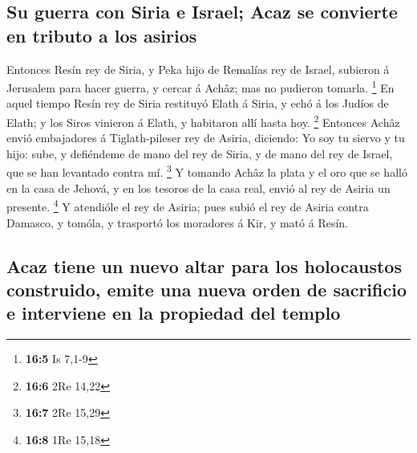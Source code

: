 \hypertarget{su-guerra-con-siria-e-israel-acaz-se-convierte-en-tributo-a-los-asirios}{%
\subsection{Su guerra con Siria e Israel; Acaz se convierte en tributo a
los
asirios}\label{su-guerra-con-siria-e-israel-acaz-se-convierte-en-tributo-a-los-asirios}}

 Entonces Resín rey de Siria, y Peka hijo de Remalías rey de
Israel, subieron á Jerusalem para hacer guerra, y cercar á Achâz; mas no
pudieron tomarla. \footnote{\textbf{16:5} Is 7,1-9}  En
aquel tiempo Resín rey de Siria restituyó Elath á Siria, y echó á los
Judíos de Elath; y los Siros vinieron á Elath, y habitaron allí hasta
hoy. \footnote{\textbf{16:6} 2Re 14,22}  Entonces Achâz
envió embajadores á Tiglath-pileser rey de Asiria, diciendo: Yo soy tu
siervo y tu hijo: sube, y defiéndeme de mano del rey de Siria, y de mano
del rey de Israel, que se han levantado contra mí. \footnote{\textbf{16:7}
  2Re 15,29}  Y tomando Achâz la plata y el oro que se halló
en la casa de Jehová, y en los tesoros de la casa real, envió al rey de
Asiria un presente. \footnote{\textbf{16:8} 1Re 15,18}  Y
atendióle el rey de Asiria; pues subió el rey de Asiria contra Damasco,
y tomóla, y trasportó los moradores á Kir, y mató á Resín.

\hypertarget{acaz-tiene-un-nuevo-altar-para-los-holocaustos-construido-emite-una-nueva-orden-de-sacrificio-e-interviene-en-la-propiedad-del-templo}{%
\subsection{Acaz tiene un nuevo altar para los holocaustos construido,
emite una nueva orden de sacrificio e interviene en la propiedad del
templo}\label{acaz-tiene-un-nuevo-altar-para-los-holocaustos-construido-emite-una-nueva-orden-de-sacrificio-e-interviene-en-la-propiedad-del-templo}}

